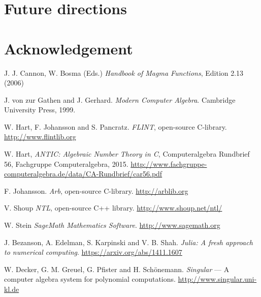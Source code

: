 \documentclass{sig-alternate-05-2015}
\begin{document}
\section{Future directions}

\section{Acknowledgement}


\begin{thebibliography}{99}

J. J. Cannon, W. Bosma (Eds.) {\em Handbook of Magma Functions}, Edition 2.13 (2006)

J. von zur Gathen and J. Gerhard. {\em Modern Computer Algebra}. Cambridge University Press, 1999.

W. Hart, F. Johansson and S. Pancratz. {\em FLINT}, open-source C-library. \url{http://www.flintlib.org}

W. Hart, {\em ANTIC: Algebraic Number Theory in C}, Computeralgebra Rundbrief 56, Fachgruppe Computeralgebra, 2015. \url{http://www.fachgruppe-computeralgebra.de/data/CA-Rundbrief/car56.pdf}

F. Johansson. {\em Arb}, open-source C-library. \url{http://arblib.org}

V. Shoup {\em NTL}, open-source C++ library. \url{http://www.shoup.net/ntl/}

W. Stein {\em SageMath Mathematics Software}.  \url{http://www.sagemath.org}

 J. Bezanson, A. Edelman, S. Karpinski and V. B. Shah. {\em Julia: A fresh approach to numerical computing}. \url{https://arxiv.org/abs/1411.1607}

 W. Decker, G. M. Greuel, G. Pfister and H. Sch\"onemann. {\em Singular} --- A computer algebra system for polynomial computations. \url{http://www.singular.uni-kl.de}

\end{thebibliography}
\end{document}
